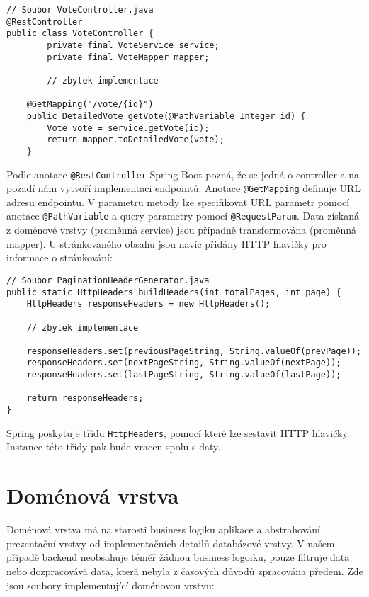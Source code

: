 \begin{lstlisting}[caption={Ukázka kódu pro vytvoření endpointu}, label={lst:controller-votes}, tabsize=2]
// Soubor VoteController.java
@RestController
public class VoteController {
		private final VoteService service;
		private final VoteMapper mapper;
		
		// zbytek implementace
		
	@GetMapping("/vote/{id}")
	public DetailedVote getVote(@PathVariable Integer id) {
		Vote vote = service.getVote(id);
		return mapper.toDetailedVote(vote);
	}
\end{lstlisting}

\noindent Podle anotace \lstinline|@RestController| Spring Boot pozná, že se jedná o controller a na pozadí nám vytvoří implementaci endpointů. Anotace \lstinline|@GetMapping| definuje URL adresu endpointu. V parametru metody lze specifikovat URL parametr pomocí anotace \lstinline|@PathVariable| a query parametry pomocí \lstinline|@RequestParam|. Data získaná z doménové vrstvy (proměnná service) jsou případně transformována (proměnná mapper). U stránkovaného obsahu jsou navíc přidány HTTP hlavičky pro informace o stránkování:

\begin{lstlisting}[caption={Ukázka nastavení hlaviček pro stránkování}, label={lst:headers-paging}, tabsize=2]
// Soubor PaginationHeaderGenerator.java
public static HttpHeaders buildHeaders(int totalPages, int page) {
	HttpHeaders responseHeaders = new HttpHeaders();

	// zbytek implementace
	
	responseHeaders.set(previousPageString, String.valueOf(prevPage));
	responseHeaders.set(nextPageString, String.valueOf(nextPage));
	responseHeaders.set(lastPageString, String.valueOf(lastPage));
	
	return responseHeaders;
}
\end{lstlisting}

\noindent Spring poskytuje třídu \lstinline|HttpHeaders|, pomocí které lze sestavit HTTP hlavičky. Instance této třídy pak bude vracen spolu s daty.

\section {Doménová vrstva}
Doménová vrstva má na starosti business logiku aplikace a abstrahování prezentační vrstvy od implementačních detailů databázové vrstvy. V našem případě backend neobsahuje téměř žádnou business logoiku, pouze filtruje data nebo dozpracovává data, která nebyla z časových důvodů zpracována předem. Zde jsou soubory implementující doménovou vrstvu:

